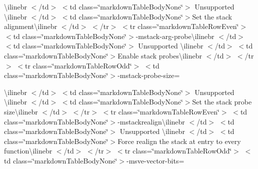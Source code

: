 \begin{longtabu}
{\ttfamily \textbackslash{}ilinebr \texorpdfstring{$<$}{<}/td\texorpdfstring{$>$}{>} \texorpdfstring{$<$}{<}td class=\char`\"{}markdown\+Table\+Body\+None\char`\"{}\texorpdfstring{$>$}{>} Unsupported \textbackslash{}ilinebr \texorpdfstring{$<$}{<}/td\texorpdfstring{$>$}{>} \texorpdfstring{$<$}{<}td class=\char`\"{}markdown\+Table\+Body\+None\char`\"{}\texorpdfstring{$>$}{>}}Set the stack alignment{\ttfamily \textbackslash{}ilinebr \texorpdfstring{$<$}{<}/td\texorpdfstring{$>$}{>} \texorpdfstring{$<$}{<}/tr\texorpdfstring{$>$}{>} \texorpdfstring{$<$}{<}tr class=\char`\"{}markdown\+Table\+Row\+Even\char`\"{}\texorpdfstring{$>$}{>} \texorpdfstring{$<$}{<}td class=\char`\"{}markdown\+Table\+Body\+None\char`\"{}\texorpdfstring{$>$}{>}}-\/mstack-\/arg-\/probe{\ttfamily \textbackslash{}ilinebr \texorpdfstring{$<$}{<}/td\texorpdfstring{$>$}{>} \texorpdfstring{$<$}{<}td class=\char`\"{}markdown\+Table\+Body\+None\char`\"{}\texorpdfstring{$>$}{>} Unsupported \textbackslash{}ilinebr \texorpdfstring{$<$}{<}/td\texorpdfstring{$>$}{>} \texorpdfstring{$<$}{<}td class=\char`\"{}markdown\+Table\+Body\+None\char`\"{}\texorpdfstring{$>$}{>}}Enable stack probes{\ttfamily \textbackslash{}ilinebr \texorpdfstring{$<$}{<}/td\texorpdfstring{$>$}{>} \texorpdfstring{$<$}{<}/tr\texorpdfstring{$>$}{>} \texorpdfstring{$<$}{<}tr class=\char`\"{}markdown\+Table\+Row\+Odd\char`\"{}\texorpdfstring{$>$}{>} \texorpdfstring{$<$}{<}td class=\char`\"{}markdown\+Table\+Body\+None\char`\"{}\texorpdfstring{$>$}{>}}-\/mstack-\/probe-\/size=

{\ttfamily \textbackslash{}ilinebr \texorpdfstring{$<$}{<}/td\texorpdfstring{$>$}{>} \texorpdfstring{$<$}{<}td class=\char`\"{}markdown\+Table\+Body\+None\char`\"{}\texorpdfstring{$>$}{>} Unsupported \textbackslash{}ilinebr \texorpdfstring{$<$}{<}/td\texorpdfstring{$>$}{>} \texorpdfstring{$<$}{<}td class=\char`\"{}markdown\+Table\+Body\+None\char`\"{}\texorpdfstring{$>$}{>}}Set the stack probe size{\ttfamily \textbackslash{}ilinebr \texorpdfstring{$<$}{<}/td\texorpdfstring{$>$}{>} \texorpdfstring{$<$}{<}/tr\texorpdfstring{$>$}{>} \texorpdfstring{$<$}{<}tr class=\char`\"{}markdown\+Table\+Row\+Even\char`\"{}\texorpdfstring{$>$}{>} \texorpdfstring{$<$}{<}td class=\char`\"{}markdown\+Table\+Body\+None\char`\"{}\texorpdfstring{$>$}{>}}-\/mstackrealign{\ttfamily \textbackslash{}ilinebr \texorpdfstring{$<$}{<}/td\texorpdfstring{$>$}{>} \texorpdfstring{$<$}{<}td class=\char`\"{}markdown\+Table\+Body\+None\char`\"{}\texorpdfstring{$>$}{>} Unsupported \textbackslash{}ilinebr \texorpdfstring{$<$}{<}/td\texorpdfstring{$>$}{>} \texorpdfstring{$<$}{<}td class=\char`\"{}markdown\+Table\+Body\+None\char`\"{}\texorpdfstring{$>$}{>}}Force realign the stack at entry to every function{\ttfamily \textbackslash{}ilinebr \texorpdfstring{$<$}{<}/td\texorpdfstring{$>$}{>} \texorpdfstring{$<$}{<}/tr\texorpdfstring{$>$}{>} \texorpdfstring{$<$}{<}tr class=\char`\"{}markdown\+Table\+Row\+Odd\char`\"{}\texorpdfstring{$>$}{>} \texorpdfstring{$<$}{<}td class=\char`\"{}markdown\+Table\+Body\+None\char`\"{}\texorpdfstring{$>$}{>}}-\/msve-\/vector-\/bits=


\end{longtabu}
